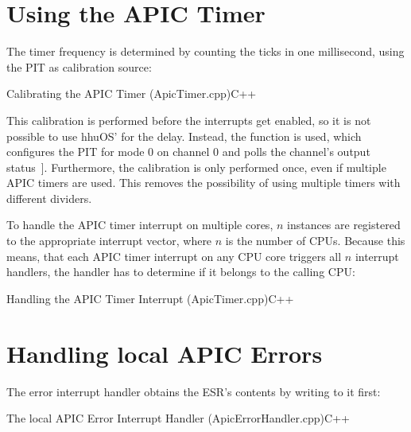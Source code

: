 \section{Using the APIC Timer}
\label{sec:apxapictimer}

The timer frequency is determined by counting the ticks in one millisecond, using the PIT as
calibration source:

\begin{codeblock}{Calibrating the APIC Timer (ApicTimer.cpp)}{C++}
\end{codeblock}

This calibration is performed before the interrupts get enabled, so it is not possible to use
hhuOS'  for the delay. Instead, the  function is used,
which configures the PIT for mode 0 on channel 0 and polls the channel's output status~\cite{pit}].
Furthermore, the calibration is only performed once, even if multiple APIC timers are used. This
removes the possibility of using multiple timers with different dividers.

To handle the APIC timer interrupt on multiple cores, \(n\)  instances are
registered to the appropriate interrupt vector, where \(n\) is the number of CPUs. Because this
means, that each APIC timer interrupt on any CPU core triggers all \(n\) interrupt handlers, the
handler has to determine if it belongs to the calling CPU:

\begin{codeblock}{Handling the APIC Timer Interrupt (ApicTimer.cpp)}{C++}
\end{codeblock}


\section{Handling local APIC Errors}
\label{sec:apxhandlingerror}

The error interrupt handler obtains the ESR's contents by writing to it first:

\begin{codeblock}{The local APIC Error Interrupt Handler (ApicErrorHandler.cpp)}{C++}
\end{codeblock}

